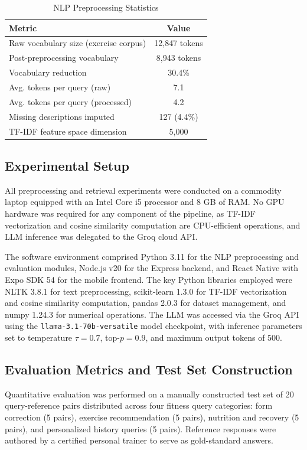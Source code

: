 \documentclass[conference]{IEEEtran}
\begin{document}
\begin{table}[htbp]
\caption{NLP Preprocessing Statistics}
\label{tab:preprocess}
\centering
\begin{tabular}{lc}
\toprule
\textbf{Metric} & \textbf{Value} \\
\midrule
Raw vocabulary size (exercise corpus) & 12,847 tokens \\
Post-preprocessing vocabulary & 8,943 tokens \\
Vocabulary reduction & 30.4\% \\
Avg. tokens per query (raw) & 7.1 \\
Avg. tokens per query (processed) & 4.2 \\
Missing descriptions imputed & 127 (4.4\%) \\
TF-IDF feature space dimension & 5,000 \\
\bottomrule
\end{tabular}
\end{table}

\subsection{Experimental Setup}

All preprocessing and retrieval experiments were conducted on a commodity laptop equipped with an Intel Core i5 processor and 8 GB of RAM. No GPU hardware was required for any component of the pipeline, as TF-IDF vectorization and cosine similarity computation are CPU-efficient operations, and LLM inference was delegated to the Groq cloud API.

The software environment comprised Python 3.11 for the NLP preprocessing and evaluation modules, Node.js v20 for the Express backend, and React Native with Expo SDK 54 for the mobile frontend. The key Python libraries employed were NLTK 3.8.1 for text preprocessing, scikit-learn 1.3.0 for TF-IDF vectorization and cosine similarity computation, pandas 2.0.3 for dataset management, and numpy 1.24.3 for numerical operations. The LLM was accessed via the Groq API using the \texttt{llama-3.1-70b-versatile} model checkpoint, with inference parameters set to temperature $\tau = 0.7$, top-$p = 0.9$, and maximum output tokens of 500.

\subsection{Evaluation Metrics and Test Set Construction}

Quantitative evaluation was performed on a manually constructed test set of 20 query-reference pairs distributed across four fitness query categories: form correction (5 pairs), exercise recommendation (5 pairs), nutrition and recovery (5 pairs), and personalized history queries (5 pairs). Reference responses were authored by a certified personal trainer to serve as gold-standard answers.
\end{document}
